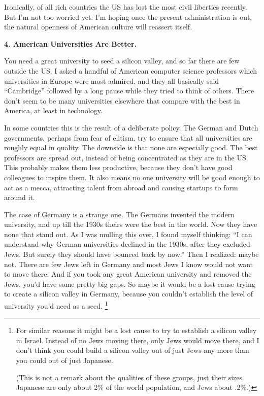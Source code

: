 \documentclass[12pt]{book}
\begin{document}
Ironically, of all rich countries the US has lost the most civil
liberties recently. But I'm not too worried yet. I'm hoping once the
present administration is out, the natural openness of American culture
will reassert itself.

\textbf{4. American Universities Are Better.}

You need a great university to seed a silicon valley, and so far there
are few outside the US. I asked a handful of American computer science
professors which universities in Europe were most admired, and they all
basically said ``Cambridge'' followed by a long pause while they tried
to think of others. There don't seem to be many universities elsewhere
that compare with the best in America, at least in technology.

In some countries this is the result of a deliberate policy. The German
and Dutch governments, perhaps from fear of elitism, try to ensure that
all universities are roughly equal in quality. The downside is that none
are especially good. The best professors are spread out, instead of
being concentrated as they are in the US. This probably makes them less
productive, because they don't have good colleagues to inspire them. It
also means no one university will be good enough to act as a mecca,
attracting talent from abroad and causing startups to form around it.

The case of Germany is a strange one. The Germans invented the modern
university, and up till the 1930s theirs were the best in the world. Now
they have none that stand out. As I was mulling this over, I found
myself thinking: ``I can understand why German universities declined in
the 1930s, after they excluded Jews. But surely they should have bounced
back by now.'' Then I realized: maybe not. There are few Jews left in
Germany and most Jews I know would not want to move there. And if you
took any great American university and removed the Jews, you'd have some
pretty big gaps. So maybe it would be a lost cause trying to create a
silicon valley in Germany, because you couldn't establish the level of
university you'd need as a seed. \footnote{For similar reasons it might be a lost cause to try to establish
a silicon valley in Israel. Instead of no Jews moving there, only Jews
would move there, and I don't think you could build a silicon valley out
of just Jews any more than you could out of just Japanese.

(This is not a remark about the qualities of these groups, just their
sizes. Japanese are only about 2\% of the world population, and Jews
about .2\%.)}
\end{document}
